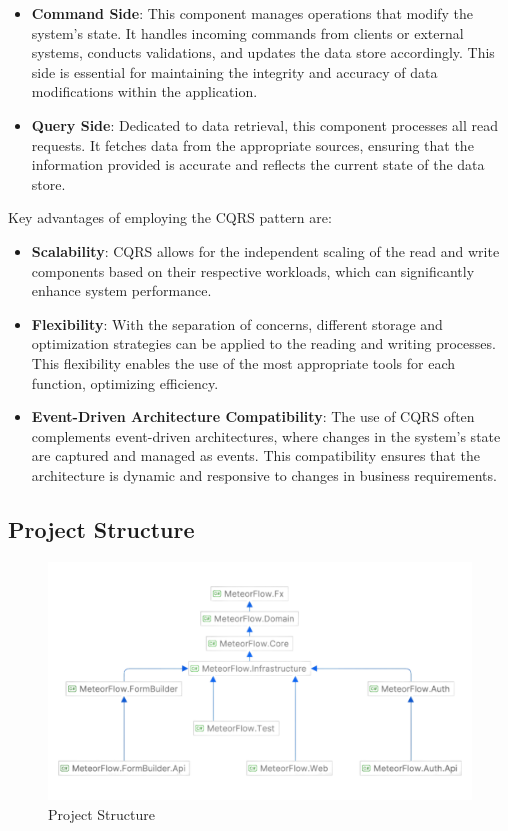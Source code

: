 \begin{itemize}
\item \textbf{Command Side}: This component manages operations that modify the
system's state. It handles incoming commands from clients or external systems,
conducts validations, and updates the data store accordingly. This side is
essential for maintaining the integrity and accuracy of data modifications
within the application.
\item \textbf{Query Side}: Dedicated to data retrieval, this component processes
all read requests. It fetches data from the appropriate sources, ensuring that
the information provided is accurate and reflects the current state of the data
store.
\end{itemize}

Key advantages of employing the CQRS pattern are:

\begin{itemize}
\item \textbf{Scalability}: CQRS allows for the independent scaling of the read
and write components based on their respective workloads, which can
significantly enhance system performance.
\item \textbf{Flexibility}: With the separation of concerns, different storage
and optimization strategies can be applied to the reading and writing processes.
This flexibility enables the use of the most appropriate tools for each
function, optimizing efficiency.
\item \textbf{Event-Driven Architecture Compatibility}: The use of CQRS often
complements event-driven architectures, where changes in the system's state are
captured and managed as events. This compatibility ensures that the architecture
is dynamic and responsive to changes in business requirements.
\end{itemize}

\subsection{Project Structure}

\begin{figure}[H]
  \centering
  \includegraphics[width=\linewidth]{Images/ProjectDir.png}
  \caption{Project Structure}
\end{figure}

